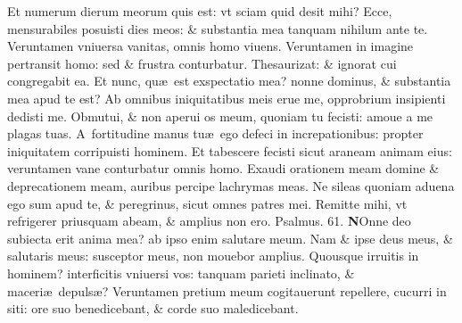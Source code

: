 \documentclass[a5paper,10pt]{book}
\def\ae{æ}
\begin{document}
\begin{multicols*}{2}
\newline \color{red} E\color{black}t numerum dierum meorum quis est: vt sciam quid desit mihi?
\newline \color{red} E\color{black}cce, mensurabiles posuisti dies meos: \& substantia mea tanquam nihilum ante te.
\newline \color{red} V\color{black}eruntamen vniuersa vanitas, omnis homo viuens.
\newline \color{red} V\color{black}eruntamen in imagine pertransit homo: sed \& frustra conturbatur.
\newline \color{red} T\color{black}hesaurizat: \& ignorat cui congregabit ea.
\newline \color{red} E\color{black}t nunc, qu\ae \ est exspectatio mea? nonne dominus, \& substantia mea apud te est?
\newline \color{red} A\color{black}b omnibus iniquitatibus meis erue me, opprobrium insipienti dedisti me.
\newline \color{red} O\color{black}bmutui, \& non aperui os meum, quoniam tu fecisti: amoue a me plagas tuas.
\newline \color{red} A\color{black}\ fortitudine manus tu\ae \ ego defeci in increpationibus: propter iniquitatem corripuisti hominem.
\newline \color{red} E\color{black}t tabescere fecisti sicut araneam animam eius: veruntamen vane conturbatur omnis homo.
\newline \color{red} E\color{black}xaudi orationem meam domine \& deprecationem meam, auribus percipe lachrymas meas.
\newline \color{red} N\color{black}e sileas quoniam aduena ego sum apud te, \& peregrinus, sicut omnes patres mei.
\newline \color{red} R\color{black}emitte mihi, vt refrigerer priusquam abeam, \& amplius non ero.
\newline \color{red} Psalmus. \hypertarget{ps61}{61.} \color{black}
\vspace{-.5em}
\lettrine[lines=2]{\bfseries \color{red} N}{}Onne deo subiecta erit anima mea? ab ipso enim salutare meum.
\newline \color{red} N\color{black}am \& ipse deus meus, \& salutaris meus: susceptor meus, non mouebor amplius.
\newline \color{red} Q\color{black}uousque irruitis in hominem? interficitis vniuersi vos: tanquam parieti inclinato, \& maceri\ae \ depuls\ae ?
\newline \color{red} V\color{black}eruntamen pretium meum cogitauerunt repellere, cucurri in siti: ore suo benedicebant, \& corde suo maledicebant.

\end{multicols*}
\end{document}
